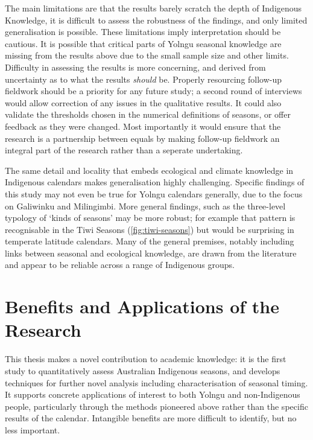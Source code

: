 The main limitations are that the results barely scratch
the depth of Indigenous Knowledge, it is difficult to assess the robustness
of the findings, and only limited generalisation is possible.  These
limitations imply interpretation should be cautious.  It is possible that
critical parts of Yolngu seasonal knowledge are missing from the results
above due to the small sample size and other limits.
%
Difficulty in assessing the results is more concerning, and derived from
uncertainty as to what the results \textit{should} be.   Properly resourcing
follow-up fieldwork should be a priority for any future study; a second round
of interviews would allow correction of any issues in the qualitative results.
It could also validate the thresholds chosen in the numerical definitions of
seasons, or offer feedback as they were changed.  Most importantly it would
ensure that the research is a partnership between equals by making follow-up
fieldwork an integral part of the research rather than a seperate undertaking.

The same detail and locality that embeds ecological and climate knowledge in
Indigenous calendars makes generalisation highly challenging.  Specific
findings of this study may not even be true for Yolngu calendars generally,
due to the focus on Galiwinku and Milingimbi.  More general findings, such as
the three-level typology of `kinds of seasons' may be more robust; for example
that pattern is recognisable in the Tiwi Seasons (\cref{fig:tiwi-seasons})
but would be surprising in temperate latitude calendars.  Many of the general premises, notably
including links between seasonal and ecological knowledge, are drawn from the
literature and appear to be reliable across a range of Indigenous groups.




\section{Benefits and Applications of the Research}
\label{sec:applications-benefits}


This thesis makes a novel contribution to academic knowledge: it is the
first study to quantitatively assess Australian Indigenous seasons, and
develops techniques for further novel analysis including characterisation
of seasonal timing.
%
It supports concrete applications of interest to both Yolngu and
non-Indigenous people, particularly through the methods pioneered above
rather than the specific results of the calendar.  Intangible benefits
are more difficult to identify, but no less important.


